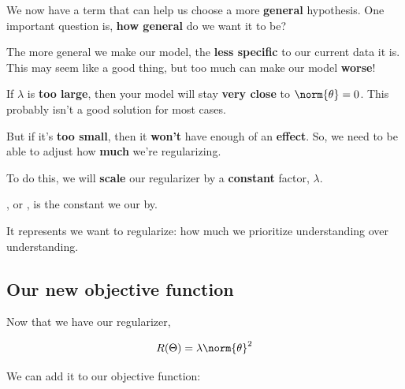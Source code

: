         We now have a term that can help us choose a more \textbf{general} hypothesis. One important question is, \textbf{how general} do we want it to be?
        
        The more general we make our model, the \textbf{less specific} to our current data it is. This may seem like a good thing, but too much can make our model \textbf{worse}!
        
        If $\lambda$ is \textbf{too large}, then your model will stay \textbf{very close} to $\norm{\theta}=0$. This probably isn't a good solution for most cases.
        
        
        But if it's \textbf{too small}, then it \textbf{won't} have enough of an \textbf{effect}. So, we need to be able to adjust how \textbf{much} we're regularizing.
        
        To do this, we will \textbf{scale} our regularizer by a \textbf{constant} factor, $\lambda$.\\
        
        \begin{definition}
            , or \vocab{$\lambda$}, is the constant we  our  by.
            
            It represents  we want to regularize: how much we prioritize  understanding over  understanding.
        \end{definition}
    
    
    
    \subsection{Our new objective function}
    
        Now that we have our regularizer,
        
        \begin{equation}
            R(\Theta) = \lambda \norm{\theta}^2
        \end{equation}
        
        We can add it to our objective function:\\
        
